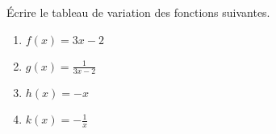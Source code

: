 
\begin{exercice}\label{exosmath-0272}

    Écrire le tableau de variation des fonctions suivantes.
    \begin{multicols}{2}
        \begin{enumerate}
            \item
                \( f(x)=3x-2\)
            \item
                \( g(x)=\frac{1}{ 3x-2 }\)
            \item
                \( h(x)=-x\)
            \item
                \( k(x)=-\frac{1}{ x }\)
        \end{enumerate}
    \end{multicols}

\end{exercice}
